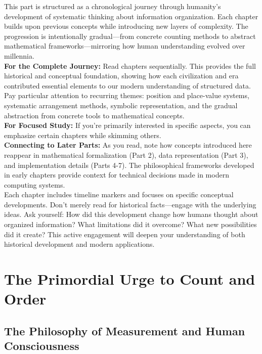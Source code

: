 \documentclass[12pt, oneside, openany]{book}
\let\oldchapter\chapter
\renewcommand{\chapter}{
	\cleardoublepage
	\thispagestyle{chapter}
	\oldchapter
}
\begin{document}
This part is structured as a chronological journey through humanity's development of systematic thinking about information organization. Each chapter builds upon previous concepts while introducing new layers of complexity. The progression is intentionally gradual—from concrete counting methods to abstract mathematical frameworks—mirroring how human understanding evolved over millennia.\\
\textbf{For the Complete Journey:} Read chapters sequentially. This provides the full historical and conceptual foundation, showing how each civilization and era contributed essential elements to our modern understanding of structured data. Pay particular attention to recurring themes: position and place-value systems, systematic arrangement methods, symbolic representation, and the gradual abstraction from concrete tools to mathematical concepts.\\
\textbf{For Focused Study:} If you're primarily interested in specific aspects, you can emphasize certain chapters while skimming others.\\
\textbf{Connecting to Later Parts:} As you read, note how concepts introduced here reappear in mathematical formalization (Part 2), data representation (Part 3), and implementation details (Parts 4-7). The philosophical frameworks developed in early chapters provide context for technical decisions made in modern computing systems.\\
Each chapter includes timeline markers and focuses on specific conceptual developments. Don't merely read for historical facts—engage with the underlying ideas. Ask yourself: How did this development change how humans thought about organized information? What limitations did it overcome? What new possibilities did it create? This active engagement will deepen your understanding of both historical development and modern applications.


\chapter{The Primordial Urge to Count and Order}
\section{The Philosophy of Measurement and Human Consciousness}
\end{document}
